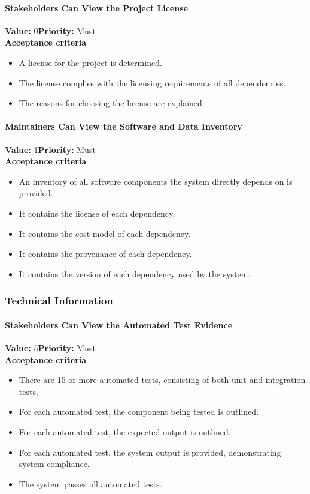 \paragraph{Stakeholders Can View the Project License}
\textbf{Value:} 0\quad \textbf{Priority:} Must\\
\textbf{Acceptance criteria}
\begin{itemize}
  \item A license for the project is determined.
  \item The license complies with the licensing requirements of all dependencies.
  \item The reasons for choosing the license are explained.
\end{itemize}

\paragraph{Maintainers Can View the Software and Data Inventory}
\textbf{Value:} 1\quad \textbf{Priority:} Must\\
\textbf{Acceptance criteria}
\begin{itemize}
  \item An inventory of all software components the system directly depends on is provided.
  \item It contains the license of each dependency.
  \item It contains the cost model of each dependency.
  \item It contains the provenance of each dependency.
  \item It contains the version of each dependency used by the system.
\end{itemize}
\subsubsection{Technical Information}

\paragraph{Stakeholders Can View the Automated Test Evidence}
\textbf{Value:} 5\quad \textbf{Priority:} Must\\
\textbf{Acceptance criteria}
\begin{itemize}
  \item There are 15 or more automated tests, consisting of both unit and integration tests.
  \item For each automated test, the component being tested is outlined.
  \item For each automated test, the expected output is outlined.
  \item For each automated test, the system output is provided, demonstrating system compliance.
  \item The system passes all automated tests.
\end{itemize}

